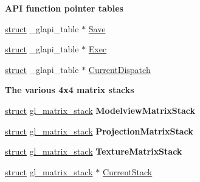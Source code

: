 \begin{Indent}\textbf{ A\+PI function pointer tables}\par
\begin{DoxyCompactItemize}
\item 
\hyperlink{interfacestruct}{struct} \+\_\+glapi\+\_\+table $\ast$ \hyperlink{structgl__context_a78d173102caa0046b96f79499f1b7db7}{Save}
\item 
\hyperlink{interfacestruct}{struct} \+\_\+glapi\+\_\+table $\ast$ \hyperlink{structgl__context_a7bd1ab1d7228f547307df028ca5d6571}{Exec}
\item 
\hyperlink{interfacestruct}{struct} \+\_\+glapi\+\_\+table $\ast$ \hyperlink{structgl__context_a92b08ad6e43e67c060819301d498c7bc}{Current\+Dispatch}
\end{DoxyCompactItemize}
\end{Indent}
\begin{Indent}\textbf{ The various 4x4 matrix stacks}\par
\begin{DoxyCompactItemize}
\item 
\mbox{\label{structgl__context_a491d962ffc903f3bac3b2f1006de511e}} 
\hyperlink{interfacestruct}{struct} \hyperlink{structgl__matrix__stack}{gl\+\_\+matrix\+\_\+stack} {\bfseries Modelview\+Matrix\+Stack}
\item 
\mbox{\label{structgl__context_a0218ec46d676a39332fbeebf1cdcec27}} 
\hyperlink{interfacestruct}{struct} \hyperlink{structgl__matrix__stack}{gl\+\_\+matrix\+\_\+stack} {\bfseries Projection\+Matrix\+Stack}
\item 
\mbox{\label{structgl__context_aa0f306667da935d512e6c48fb219a820}} 
\hyperlink{interfacestruct}{struct} \hyperlink{structgl__matrix__stack}{gl\+\_\+matrix\+\_\+stack} {\bfseries Texture\+Matrix\+Stack}
\item 
\hyperlink{interfacestruct}{struct} \hyperlink{structgl__matrix__stack}{gl\+\_\+matrix\+\_\+stack} $\ast$ \hyperlink{structgl__context_ab49feb8f976150ad03e8da17a98fe06c}{Current\+Stack}
\end{DoxyCompactItemize}
\end{Indent}
